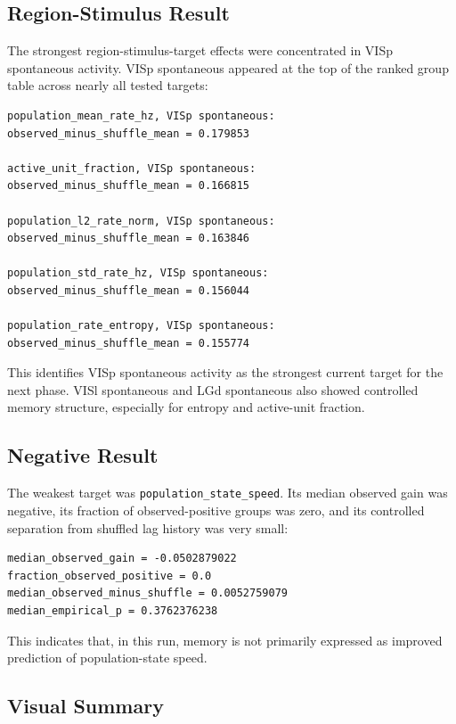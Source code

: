 \subsection{Region-Stimulus Result}

The strongest region-stimulus-target effects were concentrated in VISp spontaneous activity. VISp spontaneous appeared at the top of the ranked group table across nearly all tested targets:

\begin{verbatim}
population_mean_rate_hz, VISp spontaneous:
observed_minus_shuffle_mean = 0.179853

active_unit_fraction, VISp spontaneous:
observed_minus_shuffle_mean = 0.166815

population_l2_rate_norm, VISp spontaneous:
observed_minus_shuffle_mean = 0.163846

population_std_rate_hz, VISp spontaneous:
observed_minus_shuffle_mean = 0.156044

population_rate_entropy, VISp spontaneous:
observed_minus_shuffle_mean = 0.155774
\end{verbatim}

This identifies VISp spontaneous activity as the strongest current target for the next phase. VISl spontaneous and LGd spontaneous also showed controlled memory structure, especially for entropy and active-unit fraction.

\subsection{Negative Result}

The weakest target was \texttt{population\_state\_speed}. Its median observed gain was negative, its fraction of observed-positive groups was zero, and its controlled separation from shuffled lag history was very small:

\begin{verbatim}
median_observed_gain = -0.0502879022
fraction_observed_positive = 0.0
median_observed_minus_shuffle = 0.0052759079
median_empirical_p = 0.3762376238
\end{verbatim}

This indicates that, in this run, memory is not primarily expressed as improved prediction of population-state speed.

\subsection{Visual Summary}

